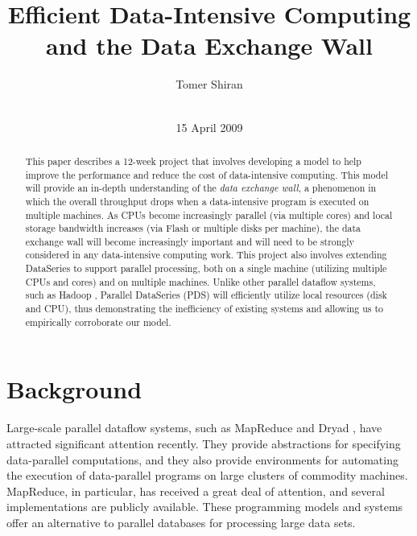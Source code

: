 \documentclass{acm_proc_article-sp}
\begin{document}
\makeatletter
\let\@copyrightspace\relax
\makeatother

\title{Efficient Data-Intensive Computing and the Data Exchange Wall}
\author{
\alignauthor
Tomer Shiran\\
       \\
\and
}
\date{15 April 2009}
\maketitle

\newenvironment{noop}{}{}

\begin{abstract}
This paper describes a 12-week project that involves developing a model to help improve the performance and reduce the cost of data-intensive computing. This model will provide an in-depth understanding of the \emph{data exchange wall}, a phenomenon in which the overall throughput drops when a data-intensive program is executed on multiple machines. As CPUs become increasingly parallel (via multiple cores) and local storage bandwidth increases (via Flash or multiple disks per machine), the data exchange wall will become increasingly important and will need to be strongly considered in any data-intensive computing work. This project also involves extending DataSeries \cite{dataseries} to support parallel processing, both on a single machine (utilizing multiple CPUs and cores) and on multiple machines. Unlike other parallel dataflow systems, such as Hadoop \cite{hadoop}, Parallel DataSeries (PDS) will efficiently utilize local resources (disk and CPU), thus demonstrating the inefficiency of existing systems and allowing us to empirically corroborate our model.
\end{abstract}

\section{Background}
Large-scale parallel dataflow systems, such as MapReduce \cite{mapreduce} and Dryad \cite{dryad}, have attracted significant attention recently. They provide abstractions for specifying data-parallel computations, and they also provide environments for automating the execution of data-parallel programs on large clusters of commodity machines. MapReduce, in particular, has received a great deal of attention, and several implementations \cite{hadoop, phoenix} are publicly available. These programming models and systems offer an alternative to parallel databases \cite{paralleldatabases} for processing large data sets.
\end{document}
